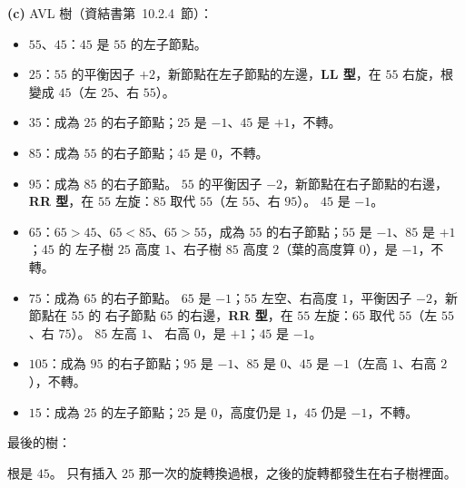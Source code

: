 \begin{pastsoln}
\textbf{(c)} AVL 樹（資結書第~10.2.4~節）：
\begin{itemize}
\item $55$、$45$：$45$ 是 $55$ 的左子節點。
\item $25$：$55$ 的平衡因子 $+2$，新節點在左子節點的左邊，\textbf{LL 型}，在 $55$ 右旋，根變成 $45$（左 $25$、右 $55$）。
\item $35$：成為 $25$ 的右子節點；$25$ 是 $-1$、$45$ 是 $+1$，不轉。
\item $85$：成為 $55$ 的右子節點；$45$ 是 $0$，不轉。
\item $95$：成為 $85$ 的右子節點。 $55$ 的平衡因子 $-2$，新節點在右子節點的右邊，\textbf{RR 型}，在
$55$ 左旋：$85$ 取代 $55$（左 $55$、右 $95$）。 $45$ 是 $-1$。
\item $65$：$65 > 45$、$65 < 85$、$65 > 55$，成為 $55$ 的右子節點；$55$ 是 $-1$、$85$ 是 $+1$；$45$ 的
左子樹 $25$ 高度 $1$、右子樹 $85$ 高度 $2$（葉的高度算 $0$），是 $-1$，不轉。
\item $75$：成為 $65$ 的右子節點。 $65$ 是 $-1$；$55$ 左空、右高度 $1$，平衡因子 $-2$，新節點在 $55$ 的
右子節點 $65$ 的右邊，\textbf{RR 型}，在 $55$ 左旋：$65$ 取代 $55$（左 $55$、右 $75$）。 $85$ 左高 $1$、
右高 $0$，是 $+1$；$45$ 是 $-1$。
\item $105$：成為 $95$ 的右子節點；$95$ 是 $-1$、$85$ 是 $0$、$45$ 是 $-1$（左高 $1$、右高 $2$），不轉。
\item $15$：成為 $25$ 的左子節點；$25$ 是 $0$，高度仍是 $1$，$45$ 仍是 $-1$，不轉。
\end{itemize}
最後的樹：
\begin{center}
\end{center}
根是 $45$。 只有插入 $25$ 那一次的旋轉換過根，之後的旋轉都發生在右子樹裡面。
\end{pastsoln}
